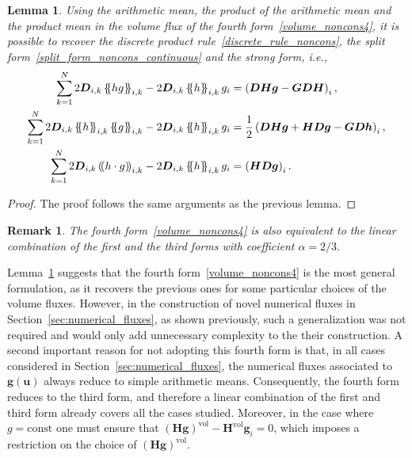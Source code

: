 \documentclass[]{scrartcl}
\newcommand*{\ldblbrace}{\{\mskip-5mu \left \{}
\newcommand*{\rdblbrace}{ \}\mskip-5mu \right \}}
\newcommand{\mean}[1]{\left\ldblbrace #1 \right\rdblbrace}
\newcommand*{\ldblparen}{(\mskip-3mu \left (}
\newcommand*{\rdblparen}{ )\mskip-3mu \right )}
\newcommand{\prodmean}[1]{\left\ldblparen #1 \right\rdblparen}
\newcommand{\mtx}[1]{\boldsymbol{#1}}
\renewcommand{\vec}[1]{\boldsymbol{#1}}
\newtheorem{lemma}[theorem]{Lemma}
\newtheorem{remark}[theorem]{Remark}
\theoremstyle{definition}
\begin{document}
\begin{lemma}
    \label{lemma:split_form_fourth_form}
Using the arithmetic mean, the product of the arithmetic mean and the product mean in the volume flux of the fourth form~\eqref{volume_noncons4}, it is possible to recover the discrete product rule~\eqref{discrete_rule_noncons}, the split form~\eqref{split_form_noncons_continuous} and the strong form, i.e.,
\begin{equation}
    \begin{aligned}
    \sum_{k=1}^N  2 \mtx{D}_{i,k} \mean{hg}_{i,k} - 2 \mtx{D}_{i,k} \mean{h}_{i,k} g_i &= \left ( \mtx{D} \mtx{H} \vec{g} - \mtx{G} \mtx{D} \vec{H} \right )_i,\\
    \sum_{k=1}^N  2 \mtx{D}_{i,k} \mean{h}_{i,k}\mean{g}_{i,k} - 2 \mtx{D}_{i,k} \mean{h}_{i,k} g_i &= \frac{1}{2} \left (\mtx{D} \mtx{H} \vec{g} + \mtx{H}  \mtx{D} \vec{g} - \vec{G} \mtx{D} \mtx{h} \right )_i,\\
    \sum_{k=1}^N  2 \mtx{D}_{i,k} \prodmean{h\cdot g}_{i,k} - 2 \mtx{D}_{i,k} \mean{h}_{i,k} g_i &= \left ( \mtx{H} \mtx{D} \vec{g} \right )_i.
    \end{aligned}
\end{equation}
\end{lemma}
\begin{proof}
The proof follows the same arguments as the previous lemma.
\end{proof}
\begin{remark}
The fourth form~\eqref{volume_noncons4} is also equivalent to the linear combination of the first and the third forms with coefficient $\alpha = 2/3$.
\end{remark}
Lemma~\ref{lemma:split_form_fourth_form} suggests that the fourth form~\eqref{volume_noncons4} is the most general formulation, as it recovers the previous ones for some particular choices of the volume fluxes.
However, in the construction of novel numerical fluxes in Section~\ref{sec:numerical_fluxes}, as shown previously, such a generalization was not required and would only add unnecessary complexity to the their construction.
A second important reason for not adopting this fourth form is that, in all cases considered in Section~\ref{sec:numerical_fluxes}, the numerical fluxes associated to $\vec{g}(\vec{u})$ always reduce to simple arithmetic means.
Consequently, the fourth form reduces to the third form, and therefore a linear combination of the first and third form already covers all the cases studied.
Moreover, in the case where $g = \text{const}$ one must ensure that $(\vec{H}\vec{g})^{\mathrm{vol}} - \vec{H}^{\mathrm{vol}}\vec{g}_i = 0$, which imposes a restriction on the choice of $(\vec{H}\vec{g})^{\mathrm{vol}}$.
\end{document}
